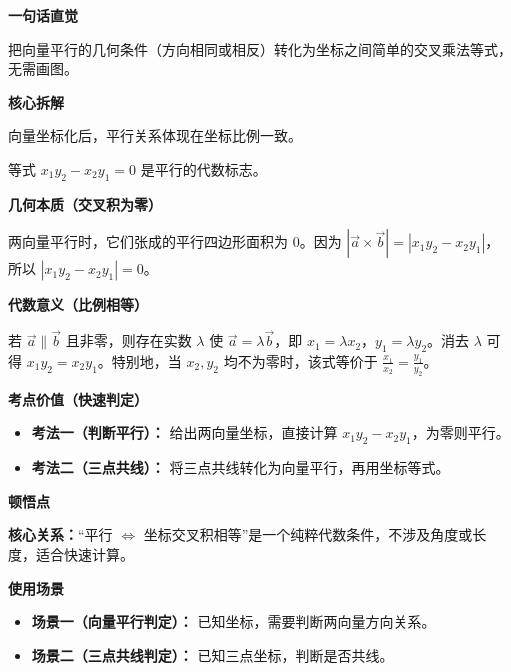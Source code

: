 \begin{explanationbox}
	\textbf{\textcolor{CExplanation}{一句话直觉}}

	把向量平行的几何条件（方向相同或相反）转化为坐标之间简单的交叉乘法等式，无需画图。

	\medskip
	\textbf{\textcolor{CExplanation}{核心拆解}}
	\begin{description}[style=nextline, leftmargin=2.8em, labelsep=0.5em, itemsep=0.45em]
		\item[\textbf{要点一（坐标表示）：}] 向量坐标化后，平行关系体现在坐标比例一致。
		\item[\textbf{要点二（叉积为零）：}] 等式 $x_1y_2 - x_2y_1 = 0$ 是平行的代数标志。
	\end{description}

	\medskip
	\textbf{\textcolor{CExplanation}{几何本质（交叉积为零）}}

	两向量平行时，它们张成的平行四边形面积为 $0$。因为 $|\vec{a}\times\vec{b}| = |x_1y_2 - x_2y_1|$，所以 $|x_1y_2 - x_2y_1| = 0$。

	\medskip
	\textbf{\textcolor{CExplanation}{代数意义（比例相等）}}

	若 $\vec{a}\parallel\vec{b}$ 且非零，则存在实数 $\lambda$ 使 $\vec{a} = \lambda\vec{b}$，即 $x_1 = \lambda x_2$，$y_1 = \lambda y_2$。消去 $\lambda$ 可得 $x_1y_2 = x_2y_1$。特别地，当 $x_2, y_2$ 均不为零时，该式等价于 $\displaystyle\frac{x_1}{x_2} = \frac{y_1}{y_2}$。

	\medskip
	\textbf{\textcolor{CExplanation}{考点价值（快速判定）}}
	\begin{itemize}[leftmargin=*, itemsep=0.5em, topsep=0.4em]
		\item \textbf{考法一（判断平行）：} 给出两向量坐标，直接计算 $x_1y_2 - x_2y_1$，为零则平行。
		\item \textbf{考法二（三点共线）：} 将三点共线转化为向量平行，再用坐标等式。
	\end{itemize}

	\medskip
	\textbf{\textcolor{CExplanation}{顿悟点}}

	\textbf{核心关系：}“平行 $\iff$ 坐标交叉积相等”是一个纯粹代数条件，不涉及角度或长度，适合快速计算。

	\medskip
	\textbf{\textcolor{CExplanation}{使用场景}}
	\begin{itemize}[leftmargin=*, itemsep=0.5em, topsep=0.4em]
		\item \textbf{场景一（向量平行判定）：} 已知坐标，需要判断两向量方向关系。
		\item \textbf{场景二（三点共线判定）：} 已知三点坐标，判断是否共线。
	\end{itemize}
\end{explanationbox}
